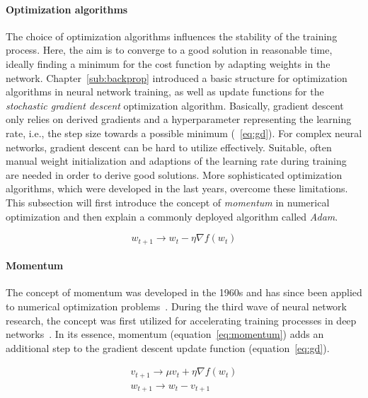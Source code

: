 \paragraph{Optimization algorithms}
\label{sub:dl_optimization_algos}

The choice of optimization algorithms influences the stability of the training
process.
Here, the aim is to converge to a good solution in reasonable time, ideally
finding a minimum for the cost function by adapting weights in the network.
Chapter~\ref{sub:backprop} introduced a basic structure for optimization
algorithms in neural network training, as well as update functions for the
\textit{stochastic gradient descent} optimization algorithm.
Basically, gradient descent only relies on derived gradients and a hyperparameter
representing the learning rate, i.e., the step size towards a possible minimum
(~\ref{eq:gd}).
For complex neural networks, gradient descent can be hard to utilize effectively.
Suitable, often manual weight initialization and adaptions of the learning rate
during training are needed in order to derive good solutions.
More sophisticated optimization algorithms, which were developed in the last
years, overcome these limitations.
This subsection will first introduce the concept of \textit{momentum} in
numerical optimization and then explain a commonly deployed algorithm called
\textit{Adam}.

\begin{equation}
  \label{eq:gd}
  w_{t+1} \rightarrow w_t - \eta \nabla f(w_t)
\end{equation}

\paragraph{Momentum}

The concept of momentum was developed in the 1960s and has since been applied
to numerical optimization problems~\cite{Polyak1964}.
During the third wave of neural network research, the concept was first
utilized for accelerating training processes in deep networks~\cite{Sutskever2013}.
In its essence, momentum (equation~\ref{eq:momentum}) adds an additional step to 
the gradient descent update function (equation~\ref{eq:gd}).

\begin{align}
  \label{eq:momentum}
  v_{t+1} \rightarrow \mu v_t + \eta \nabla f(w_t) \\
  w_{t+1} \rightarrow w_t - v_{t+1}
\end{align}

